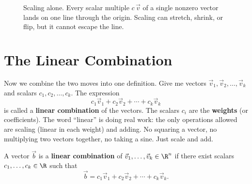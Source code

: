 \begin{figure}[H]
\centering
{}
\caption{Scaling alone. Every scalar multiple $c\,\vec{v}$ of a single nonzero vector lands on one line through the origin. Scaling can stretch, shrink, or flip, but it cannot escape the line.}
\label{ch03:scaling-line}
\end{figure}

\section{The Linear Combination}

Now we combine the two moves into one definition. Give me vectors $\vec{v}_1, \vec{v}_2, \dots, \vec{v}_k$ and scalars $c_1, c_2, \dots, c_k$. The expression
\[
  c_1 \vec{v}_1 + c_2 \vec{v}_2 + \cdots + c_k \vec{v}_k
\]
is called a \textbf{linear combination} of the vectors. The scalars $c_i$ are the \textbf{weights} (or coefficients). The word ``linear'' is doing real work: the only operations allowed are scaling (linear in each weight) and adding. No squaring a vector, no multiplying two vectors together, no taking a sine. Just scale and add.

\begin{definition}\label{ch03:def-lincomb}
A vector $\vec{b}$ is a \textbf{linear combination} of $\vec{v}_1,\dots,\vec{v}_k \in \R^n$ if there exist scalars $c_1,\dots,c_k \in \R$ such that
\[
  \vec{b} = c_1\vec{v}_1 + c_2\vec{v}_2 + \cdots + c_k\vec{v}_k.
\]
\end{definition}

